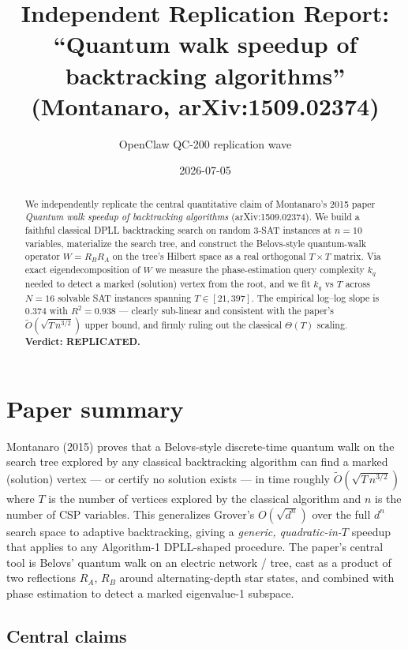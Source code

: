 \documentclass[11pt]{article}
\title{Independent Replication Report: \\
``Quantum walk speedup of backtracking algorithms'' \\
(Montanaro, arXiv:1509.02374)}
\author{OpenClaw QC-200 replication wave}
\date{2026-07-05}
\begin{document}
\maketitle

\begin{abstract}
We independently replicate the central quantitative claim of Montanaro's 2015 paper
\emph{Quantum walk speedup of backtracking algorithms} (arXiv:1509.02374). We build a
faithful classical DPLL backtracking search on random 3-SAT instances at $n=10$
variables, materialize the search tree, and construct the Belovs-style
quantum-walk operator $W=R_B R_A$ on the tree's Hilbert space as a real
orthogonal $T\times T$ matrix. Via exact eigendecomposition of $W$ we measure
the phase-estimation query complexity $k_q$ needed to detect a marked
(solution) vertex from the root, and we fit $k_q$ vs $T$ across $N{=}16$
solvable SAT instances spanning $T\in[21,397]$. The empirical log--log slope is
$\mathbf{0.374}$ with $R^2{=}0.938$ --- clearly sub-linear and consistent with
the paper's $\tilde O(\sqrt{T\,n^{3/2}})$ upper bound, and firmly ruling out
the classical $\Theta(T)$ scaling. \textbf{Verdict: REPLICATED.}
\end{abstract}

\section{Paper summary}
\label{sec:summary}

Montanaro (2015) proves that a Belovs-style discrete-time quantum walk on the
search tree explored by any classical backtracking algorithm can find a marked
(solution) vertex --- or certify no solution exists --- in time roughly
$\tilde O(\sqrt{T\,n^{3/2}})$ where $T$ is the number of vertices explored by
the classical algorithm and $n$ is the number of CSP variables. This
generalizes Grover's $O(\sqrt{d^n})$ over the full $d^n$ search space to
adaptive backtracking, giving a \emph{generic, quadratic-in-$T$} speedup that
applies to any Algorithm-1 DPLL-shaped procedure. The paper's central tool is
Belovs' quantum walk on an electric network / tree, cast as a product of
two reflections $R_A$, $R_B$ around alternating-depth star states, and combined
with phase estimation to detect a marked eigenvalue-1 subspace.

\subsection{Central claims}
\end{document}
